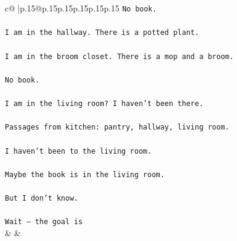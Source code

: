 \documentclass{article}
\begin{document}
{\begin{supertabular}{c@{$\;$}|p{.15\linewidth}@{}p{.15\linewidth}p{.15\linewidth}p{.15\linewidth}p{.15\linewidth}p{.15\linewidth}}
{{{\texttt{No book.} \\
\\ 
\texttt{I am in the hallway. There is a potted plant.} \\
\\ 
\texttt{I am in the broom closet. There is a mop and a broom.} \\
\\ 
\texttt{No book.} \\
\\ 
\texttt{I am in the living room? I haven't been there.} \\
\\ 
\texttt{Passages from kitchen: pantry, hallway, living room.} \\
\\ 
\texttt{I haven't been to the living room.} \\
\\ 
\texttt{Maybe the book is in the living room.} \\
\\ 
\texttt{But I don't know.} \\
\\ 
\texttt{Wait — the goal is} \\
            }
        }
    }
    & & \\ \\


\end{supertabular}}
\end{document}
